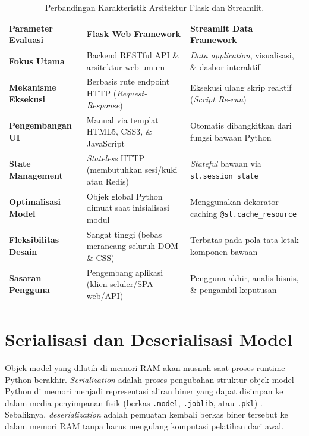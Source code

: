 \documentclass[a4paper,oneside,12pt]{report}
\begin{document}
\begin{table}[H]
\centering
\caption{Perbandingan Karakteristik Arsitektur Flask dan Streamlit.}
\label{tab:komparasi-flask-streamlit}
\small
\begin{tabularx}{\textwidth}{|>{\raggedright\arraybackslash}p{3.2cm}|>{\raggedright\arraybackslash}X|>{\raggedright\arraybackslash}X|}
\hline
\textbf{Parameter Evaluasi} & \textbf{Flask Web Framework} & \textbf{Streamlit Data Framework} \\
\hline
\textbf{Fokus Utama} & Backend RESTful API \& arsitektur web umum & \textit{Data application}, visualisasi, \& dasbor interaktif \\
\hline
\textbf{Mekanisme Eksekusi} & Berbasis rute endpoint HTTP (\textit{Request-Response}) & Eksekusi ulang skrip reaktif (\textit{Script Re-run}) \\
\hline
\textbf{Pengembangan UI} & Manual via templat HTML5, CSS3, \& JavaScript & Otomatis dibangkitkan dari fungsi bawaan Python \\
\hline
\textbf{State Management} & \textit{Stateless} HTTP (membutuhkan sesi/kuki atau Redis) & \textit{Stateful} bawaan via \texttt{st.session\_state} \\
\hline
\textbf{Optimalisasi Model} & Objek global Python dimuat saat inisialisasi modul & Menggunakan dekorator caching \texttt{@st.cache\_resource} \\
\hline
\textbf{Fleksibilitas Desain} & Sangat tinggi (bebas merancang seluruh DOM \& CSS) & Terbatas pada pola tata letak komponen bawaan \\
\hline
\textbf{Sasaran Pengguna} & Pengembang aplikasi (klien seluler/SPA web/API) & Pengguna akhir, analis bisnis, \& pengambil keputusan \\
\hline
\end{tabularx}
\end{table}

\section{Serialisasi dan Deserialisasi Model}
Objek model yang dilatih di memori RAM akan musnah saat proses runtime Python berakhir. \textit{Serialization} adalah proses pengubahan struktur objek model Python di memori menjadi representasi aliran biner yang dapat disimpan ke dalam media penyimpanan fisik (berkas \texttt{.model}, \texttt{.joblib}, atau \texttt{.pkl}) \cite{sklearn-persistence}. Sebaliknya, \textit{deserialization} adalah pemuatan kembali berkas biner tersebut ke dalam memori RAM tanpa harus mengulang komputasi pelatihan dari awal.
\end{document}
